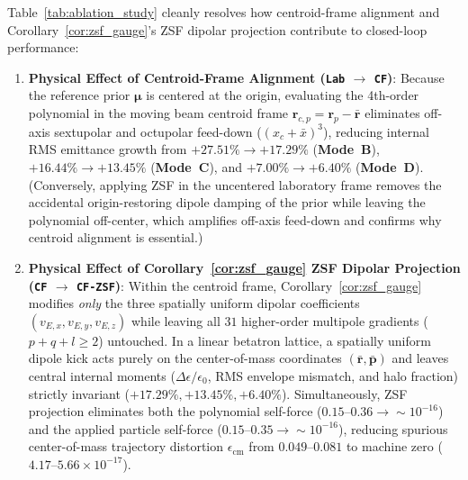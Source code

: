 \documentclass[11pt,a4paper]{article}
\begin{document}
Table~\ref{tab:ablation_study} cleanly resolves how centroid-frame alignment and Corollary~\ref{cor:zsf_gauge}'s ZSF dipolar projection contribute to closed-loop performance:
\begin{enumerate}
    \item \textbf{Physical Effect of Centroid-Frame Alignment (\texttt{Lab} $\to$ \texttt{CF})}: Because the reference prior $\bm{\mu}$ is centered at the origin, evaluating the 4th-order polynomial in the moving beam centroid frame $\bm{r}_{c,p} = \bm{r}_p - \bar{\bm{r}}$ eliminates off-axis sextupolar and octupolar feed-down ($(x_c + \bar{x})^3$), reducing internal RMS emittance growth from $+27.51\% \to +17.29\%$ (\textbf{Mode~B}), $+16.44\% \to +13.45\%$ (\textbf{Mode~C}), and $+7.00\% \to +6.40\%$ (\textbf{Mode~D}). (Conversely, applying ZSF in the uncentered laboratory frame removes the accidental origin-restoring dipole damping of the prior while leaving the polynomial off-center, which amplifies off-axis feed-down and confirms why centroid alignment is essential.)
    \item \textbf{Physical Effect of Corollary~\ref{cor:zsf_gauge} ZSF Dipolar Projection (\texttt{CF} $\to$ \texttt{CF-ZSF})}: Within the centroid frame, Corollary~\ref{cor:zsf_gauge} modifies \emph{only} the three spatially uniform dipolar coefficients $(v_{E,x}, v_{E,y}, v_{E,z})$ while leaving all $31$ higher-order multipole gradients ($p+q+l \ge 2$) untouched. In a linear betatron lattice, a spatially uniform dipole kick acts purely on the center-of-mass coordinates $(\bar{\bm{r}}, \bar{\bm{p}})$ and leaves central internal moments ($\Delta\epsilon/\epsilon_0$, RMS envelope mismatch, and halo fraction) strictly invariant ($+17.29\%, +13.45\%, +6.40\%$). Simultaneously, ZSF projection eliminates both the polynomial self-force ($0.15\text{--}0.36 \to \sim 10^{-16}$) and the applied particle self-force ($0.15\text{--}0.35 \to \sim 10^{-16}$), reducing spurious center-of-mass trajectory distortion $\epsilon_{\mathrm{cm}}$ from $0.049\text{--}0.081$ to machine zero ($4.17\text{--}5.66 \times 10^{-17}$).
\end{enumerate}
\end{document}
